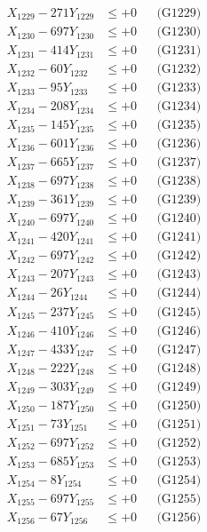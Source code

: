\documentclass[a4paper,10pt]{article}
\begin{document}
{\begin{align}
X_{1229} - 271Y_{1229} &\leq +0 && \text{(G1229)} \\
X_{1230} - 697Y_{1230} &\leq +0 && \text{(G1230)} \\
\allowbreak
X_{1231} - 414Y_{1231} &\leq +0 && \text{(G1231)} \\
X_{1232} - 60Y_{1232} &\leq +0 && \text{(G1232)} \\
X_{1233} - 95Y_{1233} &\leq +0 && \text{(G1233)} \\
X_{1234} - 208Y_{1234} &\leq +0 && \text{(G1234)} \\
X_{1235} - 145Y_{1235} &\leq +0 && \text{(G1235)} \\
X_{1236} - 601Y_{1236} &\leq +0 && \text{(G1236)} \\
X_{1237} - 665Y_{1237} &\leq +0 && \text{(G1237)} \\
X_{1238} - 697Y_{1238} &\leq +0 && \text{(G1238)} \\
X_{1239} - 361Y_{1239} &\leq +0 && \text{(G1239)} \\
X_{1240} - 697Y_{1240} &\leq +0 && \text{(G1240)} \\
\allowbreak
X_{1241} - 420Y_{1241} &\leq +0 && \text{(G1241)} \\
X_{1242} - 697Y_{1242} &\leq +0 && \text{(G1242)} \\
X_{1243} - 207Y_{1243} &\leq +0 && \text{(G1243)} \\
X_{1244} - 26Y_{1244} &\leq +0 && \text{(G1244)} \\
X_{1245} - 237Y_{1245} &\leq +0 && \text{(G1245)} \\
X_{1246} - 410Y_{1246} &\leq +0 && \text{(G1246)} \\
X_{1247} - 433Y_{1247} &\leq +0 && \text{(G1247)} \\
X_{1248} - 222Y_{1248} &\leq +0 && \text{(G1248)} \\
X_{1249} - 303Y_{1249} &\leq +0 && \text{(G1249)} \\
X_{1250} - 187Y_{1250} &\leq +0 && \text{(G1250)} \\
\allowbreak
X_{1251} - 73Y_{1251} &\leq +0 && \text{(G1251)} \\
X_{1252} - 697Y_{1252} &\leq +0 && \text{(G1252)} \\
X_{1253} - 685Y_{1253} &\leq +0 && \text{(G1253)} \\
X_{1254} - 8Y_{1254} &\leq +0 && \text{(G1254)} \\
X_{1255} - 697Y_{1255} &\leq +0 && \text{(G1255)} \\
X_{1256} - 67Y_{1256} &\leq +0 && \text{(G1256)} \\

\end{align}}
\end{document}
